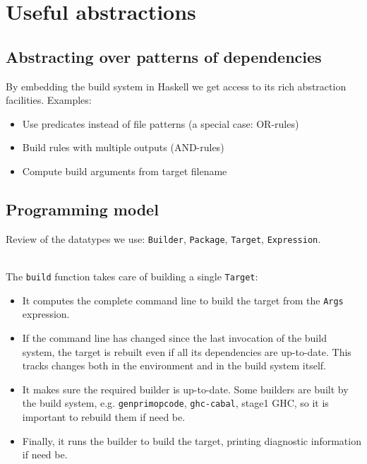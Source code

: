 \section{Useful abstractions\label{section-abstractions}}

\subsection{Abstracting over patterns of dependencies}

By embedding the build system in Haskell we get access to its rich abstraction
facilities. Examples:
\begin{itemize}
  \item Use predicates instead of file patterns (a special case: OR-rules)
  \item Build rules with multiple outputs (AND-rules)
  \item Compute build arguments from target filename
\end{itemize}

\subsection{Programming model}

Review of the datatypes we use: \texttt{Builder}, \texttt{Package},
\texttt{Target}, \texttt{Expression}. 

~\\
\noindent The \texttt{build} function takes care of building a single
\texttt{Target}:
\begin{itemize}
  \item It computes the complete command line to build the target from the
  \texttt{Args} expression.
  \item If the command line has changed since the last invocation of the build
  system, the target is rebuilt even if all its dependencies are up-to-date.
  This tracks changes both in the environment and in the build system itself.
  \item It makes sure the required builder is up-to-date. Some builders are
  built by the build system, e.g. \texttt{genprimopcode}, \texttt{ghc-cabal},
  stage1 GHC, so it is important to rebuild them if need be.
  \item Finally, it runs the builder to build the target, printing diagnostic
  information if need be.
\end{itemize}



